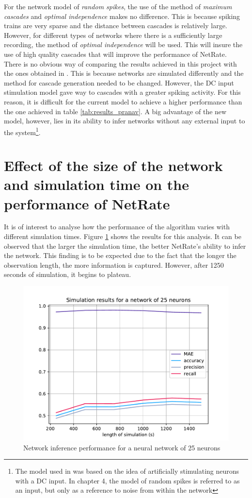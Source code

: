 For the network model of \textit{random spikes}, the use of the method of \textit{maximum cascades} and \textit{optimal independence} makes no difference. This is because spiking trains are very sparse and the distance between cascades is relatively large. However, for different types of networks where there is a sufficiently large recording, the method of \textit{optimal independence} will be used. This will insure the use of high quality cascades that will improve the performance of NetRate.\\

There is no obvious way of comparing the results achieved in this project with the ones obtained in \cite{alexandru2018estimating}. This is because networks are simulated differently and the method for cascade generation needed to be changed. However, the DC input stimulation model gave way to cascades with a greater spiking activity. For this reason, it is difficult for the current model to achieve a higher performance than the one achieved in table \ref{tab:results_pranav}. A big advantage of the new model, however, lies in its ability to infer networks without any external input to the system\footnote{The model used in \cite{alexandru2018estimating} was based on the idea of artificially stimulating neurons with a DC input. In chapter 4, the model of random spikes is referred to as an input, but only as a reference to noise from within the network}.

\section{Effect of the size of the network and simulation time on the performance of NetRate}

It is of interest to analyse how the performance of the algorithm varies with different simulation times. Figure \ref{fig:results_25_neurons} shows the results for this analysis. It can be observed that the larger the simulation time, the better NetRate's ability to infer the network. This finding is to be expected due to the fact that the longer the observation length, the more information is captured. However, after 1250 seconds of simulation, it begins to plateau.

\begin{figure}
	\centering
	\includegraphics[width=0.8\linewidth]{results_25_neurons.pdf}
	\caption{Network inference performance for a neural network of 25 neurons}
	\label{fig:results_25_neurons}
\end{figure}

